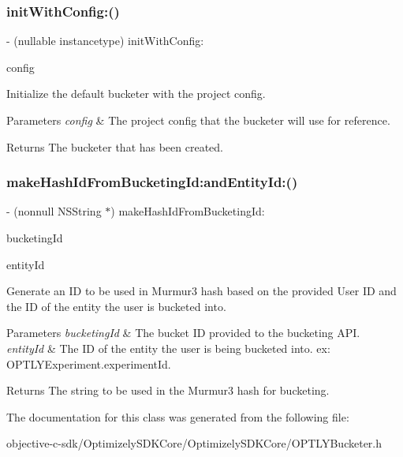 \subsubsection{\texorpdfstring{init\+With\+Config\+:()}{initWithConfig:()}}
{\footnotesize\ttfamily -\/ (nullable instancetype) init\+With\+Config\+: \begin{DoxyParamCaption}\item[{(nonnull O\+P\+T\+L\+Y\+Project\+Config $\ast$)}]{config }\end{DoxyParamCaption}}

Initialize the default bucketer with the project config. 
\begin{DoxyParams}{Parameters}
{\em config} & The project config that the bucketer will use for reference. \\
\hline
\end{DoxyParams}
\begin{DoxyReturn}{Returns}
The bucketer that has been created. 
\end{DoxyReturn}
\mbox{\label{interface_o_p_t_l_y_bucketer_ac2a6df329e8a9960499c272b1c0b47a9}} 
\subsubsection{\texorpdfstring{make\+Hash\+Id\+From\+Bucketing\+Id\+:and\+Entity\+Id\+:()}{makeHashIdFromBucketingId:andEntityId:()}}
{\footnotesize\ttfamily -\/ (nonnull N\+S\+String $\ast$) make\+Hash\+Id\+From\+Bucketing\+Id\+: \begin{DoxyParamCaption}\item[{(nonnull N\+S\+String $\ast$)}]{bucketing\+Id }\item[{andEntityId:(nonnull N\+S\+String $\ast$)}]{entity\+Id }\end{DoxyParamCaption}}

Generate an ID to be used in Murmur3 hash based on the provided User ID and the ID of the entity the user is bucketed into. 
\begin{DoxyParams}{Parameters}
{\em bucketing\+Id} & The bucket ID provided to the bucketing A\+PI. \\
\hline
{\em entity\+Id} & The ID of the entity the user is being bucketed into. ex\+: O\+P\+T\+L\+Y\+Experiment.\+experiment\+Id. \\
\hline
\end{DoxyParams}
\begin{DoxyReturn}{Returns}
The string to be used in the Murmur3 hash for bucketing. 
\end{DoxyReturn}


The documentation for this class was generated from the following file\+:\begin{DoxyCompactItemize}
\item 
objective-\/c-\/sdk/\+Optimizely\+S\+D\+K\+Core/\+Optimizely\+S\+D\+K\+Core/O\+P\+T\+L\+Y\+Bucketer.\+h\end{DoxyCompactItemize}

